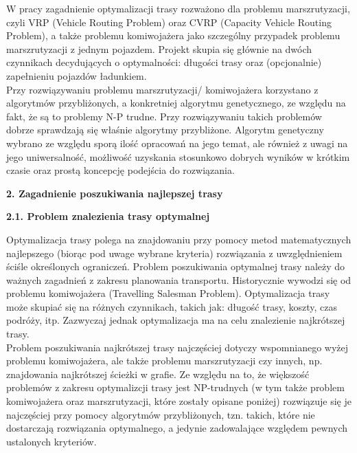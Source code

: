 \documentclass[a4paper, twoside, 12pt, justified]{article}
\begin{document}
	W pracy zagadnienie optymalizacji trasy rozważono dla problemu marszrutyzacji, czyli VRP (Vehicle Routing Problem) oraz CVRP (Capacity Vehicle Routing Problem), a także problemu komiwojażera jako szczególny przypadek problemu marszrutyzacji z jednym pojazdem. Projekt skupia się głównie na dwóch czynnikach decydujących o optymalności: długości trasy oraz (opcjonalnie) zapełnieniu pojazdów ładunkiem. \\
	Przy rozwiązywaniu problemu marszrutyzacji/ komiwojażera korzystano z algorytmów przybliżonych, a konkretniej algorytmu genetycznego, ze względu na fakt, że są to problemy N-P trudne. Przy rozwiązywaniu takich problemów dobrze sprawdzają się właśnie algorytmy przybliżone. Algorytm genetyczny wybrano ze względu sporą ilość opracowań na jego temat, ale również z uwagi na jego uniwersalność, możliwość uzyskania stosunkowo dobrych wyników w krótkim czasie oraz prostą koncepcję podejścia do rozwiązania. \\
	
	
	
	\newpage
	\begin{flushleft}
		\begin{LARGE}
			\textbf{2. Zagadnienie poszukiwania najlepszej trasy}
		\end{LARGE}
	\end{flushleft}


	\begin{flushleft}
		\begin{large}
			\textbf{2.1. Problem znalezienia trasy optymalnej}
		\end{large}
	\end{flushleft}
	\vspace{5mm} %
	
	Optymalizacja trasy polega na znajdowaniu przy pomocy metod matematycznych najlepszego (biorąc pod uwage wybrane kryteria) rozwiązania z uwzględnieniem ściśle określonych ograniczeń. Problem poszukiwania optymalnej trasy należy do ważnych zagadnień z zakresu planowania transportu. Historycznie wywodzi się od problemu komiwojażera (Travelling Salesman Problem). Optymalizacja trasy może skupiać się na różnych czynnikach, takich jak: długość trasy, koszty, czas podróży, itp. Zazwyczaj jednak optymalizacja ma na celu znalezienie najkrótszej trasy.\\
	Problem poszukiwania najkrótszej trasy najczęściej dotyczy wspomnianego wyżej problemu komiwojażera, ale także problemu marszrutyzacji czy innych, np. znajdowania najkrótszej ścieżki w grafie. Ze względu na to, że większość problemów z zakresu optymalizcji trasy jest NP-trudnych (w tym także problem komiwojażera oraz marszrutyzacji, które zostały opisane poniżej) rozwiązuje się je najczęściej przy pomocy algorytmów przybliżonych, tzn. takich, które nie dostarczają rozwiązania optymalnego, a jedynie zadowalające względem pewnych ustalonych kryteriów. 
	
\end{document}
